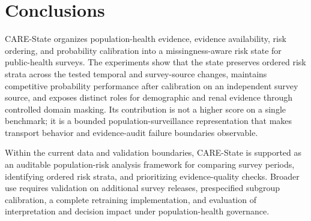 \documentclass[12pt]{article}
\begin{document}
\section{Conclusions}
CARE-State organizes population-health evidence, evidence availability, risk ordering, and probability calibration into a missingness-aware risk state for public-health surveys. The experiments show that the state preserves ordered risk strata across the tested temporal and survey-source changes, maintains competitive probability performance after calibration on an independent survey source, and exposes distinct roles for demographic and renal evidence through controlled domain masking. Its contribution is not a higher score on a single benchmark; it is a bounded population-surveillance representation that makes transport behavior and evidence-audit failure boundaries observable.

Within the current data and validation boundaries, CARE-State is supported as an auditable population-risk analysis framework for comparing survey periods, identifying ordered risk strata, and prioritizing evidence-quality checks. Broader use requires validation on additional survey releases, prespecified subgroup calibration, a complete retraining implementation, and evaluation of interpretation and decision impact under population-health governance.
\end{document}
